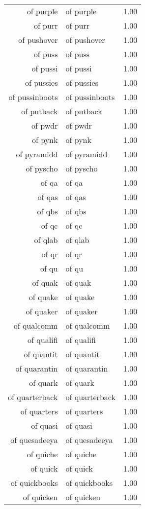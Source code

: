 \begin{table}[ht]
\begin{tabular}{rlr}
  of purple & of purple & 1.00 \\ 
  of purr & of purr & 1.00 \\ 
  of pushover & of pushover & 1.00 \\ 
  of puss & of puss & 1.00 \\ 
  of pussi & of pussi & 1.00 \\ 
  of pussies & of pussies & 1.00 \\ 
  of pussinboots & of pussinboots & 1.00 \\ 
  of putback & of putback & 1.00 \\ 
  of pwdr & of pwdr & 1.00 \\ 
  of pynk & of pynk & 1.00 \\ 
  of pyramidd & of pyramidd & 1.00 \\ 
  of pyscho & of pyscho & 1.00 \\ 
  of qa & of qa & 1.00 \\ 
  of qas & of qas & 1.00 \\ 
  of qbs & of qbs & 1.00 \\ 
  of qc & of qc & 1.00 \\ 
  of qlab & of qlab & 1.00 \\ 
  of qr & of qr & 1.00 \\ 
  of qu & of qu & 1.00 \\ 
  of quak & of quak & 1.00 \\ 
  of quake & of quake & 1.00 \\ 
  of quaker & of quaker & 1.00 \\ 
  of qualcomm & of qualcomm & 1.00 \\ 
  of qualifi & of qualifi & 1.00 \\ 
  of quantit & of quantit & 1.00 \\ 
  of quarantin & of quarantin & 1.00 \\ 
  of quark & of quark & 1.00 \\ 
  of quarterback & of quarterback & 1.00 \\ 
  of quarters & of quarters & 1.00 \\ 
  of quasi & of quasi & 1.00 \\ 
  of quesadeeya & of quesadeeya & 1.00 \\ 
  of quiche & of quiche & 1.00 \\ 
  of quick & of quick & 1.00 \\ 
  of quickbooks & of quickbooks & 1.00 \\ 
  of quicken & of quicken & 1.00 \\ 

\end{tabular}
\end{table}
